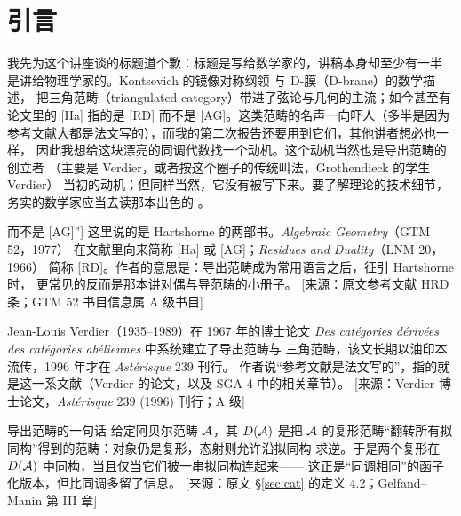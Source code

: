\section{引言}\label{sec:intro}

我先为这个讲座谈的标题道个歉\cite{Ma}：标题是写给数学家的，讲稿本身却至少有一半
是讲给物理学家的。Kontsevich 的镜像对称纲领\cite{K} 与 D-膜（D-brane）的数学描述，
把三角范畴（triangulated category）带进了弦论与几何的主流；如今甚至有论文里的
[Ha] 指的是 [RD] 而不是 [AG]。这类范畴的名声一向吓人（多半是因为
参考文献大都是法文写的），而我的第二次报告还要用到它们，其他讲者想必也一样，
因此我想给这块漂亮的同调代数找一个动机。这个动机当然也是导出范畴的创立者
（主要是 Verdier，或者按这个圈子的传统叫法，Grothendieck 的学生 Verdier）
当初的动机；但同样当然，它没有被写下来。要了解理论的技术细节，
务实的数学家应当去读那本出色的 \cGM。

\begin{yizhu}[“$\mathrm{[Ha]}$ 指 [RD] 而不是 [AG]”]
这里说的是 Hartshorne 的两部书。\emph{Algebraic Geometry}（GTM 52，1977）
在文献里向来简称 [Ha] 或 [AG]；\emph{Residues and Duality}（LNM 20，1966）
简称 [RD]。作者的意思是：导出范畴成为常用语言之后，征引 Hartshorne 时，
更常见的反而是那本讲对偶与导范畴的小册子。
[来源：原文参考文献 HRD 条；GTM 52 书目信息属 A 级书目]
\end{yizhu}

\begin{yizhu}
Jean-Louis Verdier（1935--1989）在 1967 年的博士论文
\emph{Des catégories dérivées des catégories abéliennes} 中系统建立了导出范畴与
三角范畴，该文长期以油印本流传，1996 年才在 \emph{Astérisque} 239 刊行。
作者说“参考文献是法文写的”，指的就是这一系文献（Verdier 的论文，以及
SGA 4\textonehalf{} 中的相关章节）。
[来源：Verdier 博士论文，\emph{Astérisque} 239 (1996) 刊行；A 级]
\end{yizhu}

\begin{conceptbox}{导出范畴的一句话}
给定阿贝尔范畴 $\mathcal{A}$，其 $D(\mathcal{A})$ 是把
$\mathcal{A}$ 的复形范畴“翻转所有拟同构”得到的范畴：对象仍是复形，态射则允许沿拟同构
求逆。于是两个复形在 $D(\mathcal{A})$ 中同构，当且仅当它们被一串拟同构连起来——
这正是“同调相同”的函子化版本，但比同调多留了信息。
[来源：原文 §\ref{sec:cat} 的定义 4.2；Gelfand--Manin 第 III 章]
\end{conceptbox}

